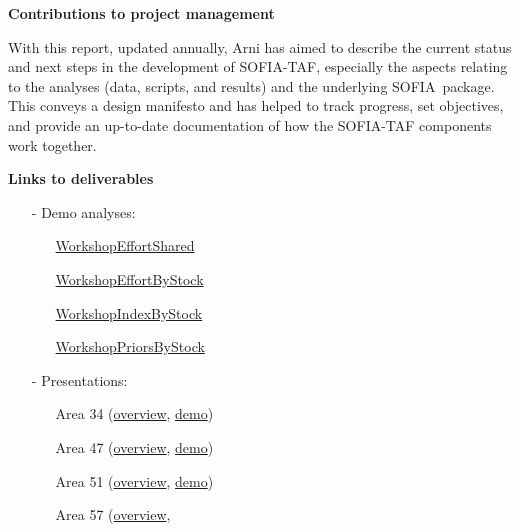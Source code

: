 \documentclass[12pt]{article}
\newcommand\blue[1]{\textcolor{darkblue}{#1}}
\newcommand\SOFIA{{\sf SOFIA}}
\newcommand\sofialink[2]{\blue{\href{https://github.com/sofia-taf/#1}{\sf #2}}}
\begin{document}
\textbf{Contributions to project management}

With this report, updated annually, Arni has aimed to describe the current
status and next steps in the development of SOFIA-TAF, especially the aspects
relating to the analyses (data, scripts, and results) and the underlying \SOFIA\
package. This conveys a design manifesto and has helped to track progress, set
objectives, and provide an up-to-date documentation of how the SOFIA-TAF
components work together.

\newpage

\textbf{Links to deliverables}

\begin{itemize}
  \item[-] Demo analyses:\\[-3.5ex]
  \begin{itemize}
    \item[] \sofialink{WorkshopEffortShared}{WorkshopEffortShared}\\[-4ex]
    \item[] \sofialink{WorkshopEffortByStock}{WorkshopEffortByStock}\\[-4ex]
    \item[] \sofialink{WorkshopIndexByStock}{WorkshopIndexByStock}\\[-4ex]
    \item[] \sofialink{WorkshopPriorsByStock}{WorkshopPriorsByStock}\\[-3ex]
  \end{itemize}
  \item[-] Presentations:\\[-3.5ex]
  \begin{itemize}
    \item[] Area 34
    (\sofialink{doc/blob/main/presentations/area_34/overview.pdf}{overview},
    \sofialink{doc/blob/main/presentations/area_34/demo.pdf}{demo})\\[-4ex]
    \item[] Area 47
    (\sofialink{doc/blob/main/presentations/area_47/overview.pdf}{overview},
    \sofialink{doc/blob/main/presentations/area_47/demo.pdf}{demo})\\[-4ex]
    \item[] Area 51
    (\sofialink{doc/blob/main/presentations/area_51/overview.pdf}{overview},
    \sofialink{doc/blob/main/presentations/area_51/demo.pdf}{demo})\\[-4ex]
    \item[] Area 57
    (\sofialink{doc/blob/main/presentations/area_57/overview.pdf}{overview},

\end{itemize}
\end{itemize}
\end{document}
